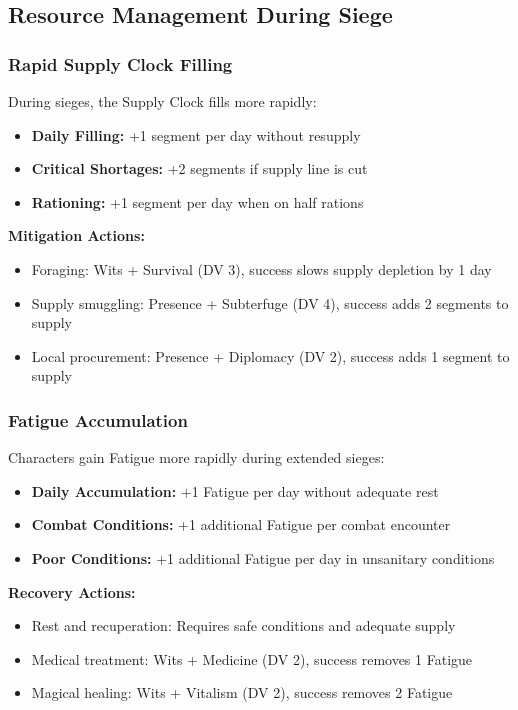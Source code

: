 \subsection{Resource Management During Siege}

\subsubsection{Rapid Supply Clock Filling}

During sieges, the Supply Clock fills more rapidly:
\begin{itemize}[leftmargin=*]
    \item \textbf{Daily Filling:} +1 segment per day without resupply
    \item \textbf{Critical Shortages:} +2 segments if supply line is cut
    \item \textbf{Rationing:} +1 segment per day when on half rations
\end{itemize}

\textbf{Mitigation Actions:}
\begin{itemize}[leftmargin=*]
    \item Foraging: Wits + Survival (DV 3), success slows supply depletion by 1 day
    \item Supply smuggling: Presence + Subterfuge (DV 4), success adds 2 segments to supply
    \item Local procurement: Presence + Diplomacy (DV 2), success adds 1 segment to supply
\end{itemize}

\subsubsection{Fatigue Accumulation}

Characters gain Fatigue more rapidly during extended sieges:
\begin{itemize}[leftmargin=*]
    \item \textbf{Daily Accumulation:} +1 Fatigue per day without adequate rest
    \item \textbf{Combat Conditions:} +1 additional Fatigue per combat encounter
    \item \textbf{Poor Conditions:} +1 additional Fatigue per day in unsanitary conditions
\end{itemize}

\textbf{Recovery Actions:}
\begin{itemize}[leftmargin=*]
    \item Rest and recuperation: Requires safe conditions and adequate supply
    \item Medical treatment: Wits + Medicine (DV 2), success removes 1 Fatigue
    \item Magical healing: Wits + Vitalism (DV 2), success removes 2 Fatigue
\end{itemize}

